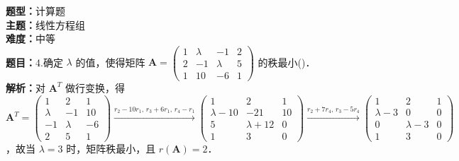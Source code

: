 \documentclass{ctexart}
\newenvironment{question}[5]{%
	\noindent\textbf{题型：}#1\\
	\textbf{主题：}#2\\
	\textbf{难度：}#3\\
	\textbf{题目：}#4\\
	\textbf{解析：}#5\\
	\vspace{1em}
}{}
\begin{document}
	\begin{question}
		{计算题}
		{线性方程组}
		{中等}
		{4.确定 \(\lambda\) 的值，使得矩阵 \(\mathbf{A}=\left(\begin{array}{cccc}1 & \lambda & -1 & 2 \\ 2 & -1 & \lambda & 5 \\ 1 & 10 & -6 & 1\end{array}\right)\) 的秩最小(\qquad)．}
		{对 \(\mathbf{A}^T\) 做行变换，得 \(\mathbf{A}^T=\left(\begin{array}{ccc}1 & 2 & 1 \\ \lambda & -1 & 10 \\ -1 & \lambda & -6 \\ 2 & 5 & 1\end{array}\right) \xrightarrow{r_2 - 10 r_1,\, r_3 + 6 r_1,\, r_4 - r_1} \left(\begin{array}{ccc}1 & 2 & 1 \\ \lambda - 10 & -21 & 10 \\ 5 & \lambda + 12 & 0 \\ 1 & 3 & 0\end{array}\right) \xrightarrow{r_2 + 7 r_4,\, r_3 - 5 r_4} \left(\begin{array}{ccc}1 & 2 & 1 \\ \lambda - 3 & 0 & 0 \\ 0 & \lambda - 3 & 0 \\ 1 & 3 & 0\end{array}\right)\) ，故当 \(\lambda = 3\) 时，矩阵秩最小，且 \(r(\mathbf{A})=2\)．}
	\end{question}
	
\end{document}
